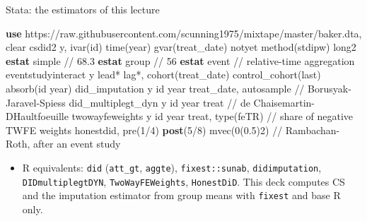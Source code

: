 \documentclass[
  11pt,
  ignorenonframetext,
  aspectratio=169,
]{beamer}
\newenvironment{Shaded}{\begin{snugshade}}{\end{snugshade}}
\newcommand{\CommentTok}[1]{\textcolor[rgb]{0.37,0.37,0.37}{#1}}
\newcommand{\DecValTok}[1]{\textcolor[rgb]{0.68,0.00,0.00}{#1}}
\newcommand{\FunctionTok}[1]{\textcolor[rgb]{0.28,0.35,0.67}{#1}}
\newcommand{\KeywordTok}[1]{\textcolor[rgb]{0.00,0.23,0.31}{\textbf{#1}}}
\newcommand{\NormalTok}[1]{\textcolor[rgb]{0.00,0.23,0.31}{#1}}
\providecommand{\tightlist}{%
  \setlength{\itemsep}{0pt}\setlength{\parskip}{0pt}}
\begin{document}
\begin{frame}[fragile]{Stata: the estimators of this lecture}
\protect{}\label{stata-the-estimators-of-this-lecture}
\begin{Shaded}
\begin{Highlighting}[]
\KeywordTok{use}\NormalTok{ https:}\CommentTok{//raw.githubusercontent.com/scunning1975/mixtape/master/baker.dta, clear}
\NormalTok{csdid2 }\FunctionTok{y}\NormalTok{, ivar(id) time(}\FunctionTok{year}\NormalTok{) gvar(treat\_date) notyet method(stdipw) long2}
\KeywordTok{estat}\NormalTok{ simple                                         }\CommentTok{// 68.3}
\KeywordTok{estat} \FunctionTok{group}                                          \CommentTok{// 56}
\KeywordTok{estat}\NormalTok{ event                                          }\CommentTok{// relative{-}time aggregation}
\NormalTok{eventstudyinteract }\FunctionTok{y}\NormalTok{ lead* lag*, cohort(treat\_date) control\_cohort(}\FunctionTok{last}\NormalTok{) absorb(id }\FunctionTok{year}\NormalTok{)}
\NormalTok{did\_imputation }\FunctionTok{y}\NormalTok{ id }\FunctionTok{year}\NormalTok{ treat\_date, autosample      }\CommentTok{// Borusyak{-}Jaravel{-}Spiess}
\NormalTok{did\_multiplegt\_dyn }\FunctionTok{y}\NormalTok{ id }\FunctionTok{year}\NormalTok{ treat                   }\CommentTok{// de Chaisemartin{-}D\textquotesingle{}Haultfoeuille}
\NormalTok{twowayfeweights }\FunctionTok{y}\NormalTok{ id }\FunctionTok{year}\NormalTok{ treat, }\DecValTok{type}\NormalTok{(feTR)          }\CommentTok{// share of negative TWFE weights}
\NormalTok{honestdid, pre(1/4) }\KeywordTok{post}\NormalTok{(5/8) mvec(0(0.5)2)          }\CommentTok{// Rambachan{-}Roth, after an event study}
\end{Highlighting}
\end{Shaded}

\begin{itemize}
\tightlist
\item
  R equivalents: \texttt{did} (\texttt{att\_gt}, \texttt{aggte}),
  \texttt{fixest::sunab}, \texttt{didimputation},
  \texttt{DIDmultiplegtDYN}, \texttt{TwoWayFEWeights},
  \texttt{HonestDiD}. This deck computes CS and the imputation estimator
  from group means with \texttt{fixest} and base R only.
\end{itemize}
\end{frame}
\end{document}
